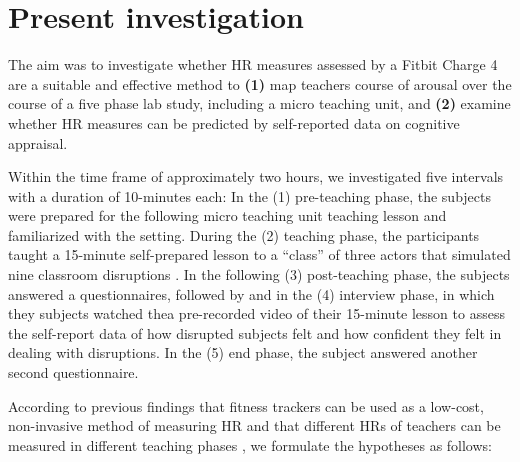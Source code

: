 \documentclass[preprint, 3p,
authoryear]{elsarticle} %
\begin{document}


\section{Present investigation}\label{present-investigation}

The aim was to investigate whether HR measures assessed by a Fitbit
Charge 4 are a suitable and effective method to \textbf{(1)} map
teachers course of arousal over the course of a five phase lab study,
including a micro teaching unit, and \textbf{(2)} examine whether HR
measures can be predicted by self-reported data on cognitive appraisal.

Within the time frame of approximately two hours, we investigated five
intervals with a duration of 10-minutes each: In the (1) pre-teaching
phase, the subjects were prepared for the following micro teaching unit
teaching lesson and familiarized with the setting. During the (2)
teaching phase, the participants taught a 15-minute self-prepared lesson
to a ``class'' of three actors that simulated nine classroom disruptions
. In the following (3) post-teaching phase, the subjects answered a
questionnaires, followed by and in the (4) interview phase, in which
they subjects watched thea pre-recorded video of their 15-minute lesson
to assess the self-report data of how disrupted subjects felt and how
confident they felt in dealing with disruptions. In the (5) end phase,
the subject answered another second questionnaire.

According to previous findings that fitness trackers can be used as a
low-cost, non-invasive method of measuring HR
\citep{hajj2022wrist, fuller2020reliability} and that different HRs of
teachers can be measured in different teaching phases
\citep{donker2020associations, junker2021potential}, we formulate the
hypotheses as follows:
\end{document}
